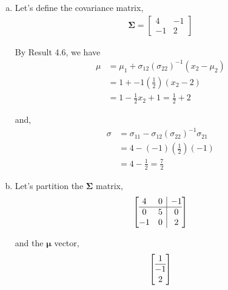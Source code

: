 \documentclass[12pt]{article}\usepackage[]{graphicx}\usepackage[]{color}
\newcommand{\vct}{\mathbf}
\begin{document}
\begin{enumerate}[a)]

\item Let's define the covariance matrix,
\begin{align*}
\vct{\Sigma} = \begin{bmatrix} 4 & -1 \\ -1 & 2 \end{bmatrix}
\end{align*}

By Result 4.6, we have 
\begin{align*}
\mu &= \mu_1 + \sigma_{12}(\sigma_{22})^{-1}(x_2 - \mu_2)\\
&= 1 + -1\left(\frac{1}{2}\right)(x_2 - 2)\\
&= 1 - \frac{1}{2}x_2 + 1 = \frac{1}{2} + 2
\end{align*}

and,
\begin{align*}
\sigma &= \sigma_{11} - \sigma_{12}(\sigma_{22})^{-1}\sigma_{21}\\
&= 4 - (-1)\left(\frac{1}{2}\right)(-1)\\
&= 4 - \frac{1}{2} = \frac{7}{2}
\end{align*}

\item Let's partition the $\vct{\Sigma}$ matrix,
\begin{align*}
\left[\begin{array}{@{}cc|c@{}}
    4 & 0 & -1 \\\hline
    0 & 5 & 0 \\
    -1 & 0 & 2
  \end{array}\right]
\end{align*}

and the $\vct{\mu}$ vector,
\begin{align*}
\left[\begin{array}{@{}c@{}}
    1 \\\hline
    -1 \\
    2
  \end{array}\right]
\end{align*}


\end{enumerate}
\end{document}
